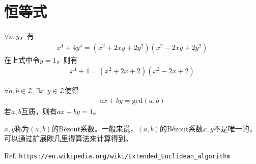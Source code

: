 
\chapter{恒等式}
\label{chap:identities}

\begin{theorem}
  $\forall x,y$，有
  \begin{align*}
    x^4 + 4y^4 = (x^2 + 2xy + 2y^2)(x^2 - 2xy + 2y^2)
  \end{align*}
  在上式中令$y=1$，则有
  \begin{align*}
    x^4 + 4 = (x^2 + 2x + 2)(x^2 - 2x + 2)
  \end{align*}
\end{theorem}

\begin{theorem}
  $\forall a,b\in\mathcal{Z},\exists x,y\in\mathcal{Z}$使得
  \begin{align*}
    ax+by=\mathrm{gcd}(a,b)
  \end{align*}
  若$a,b$互质，则有$ax+by=1$。
\end{theorem}

$x,y$称为$(a,b)$的B\'ezout系数。一般来说，$(a,b)$的B\'ezout系数$x,y$不是唯一的，可以通过扩展欧几里得算法来计算得到。

\begin{definition}[扩展欧几里得算法]
  Ref. \verb|https://en.wikipedia.org/wiki/Extended_Euclidean_algorithm|
\end{definition}


